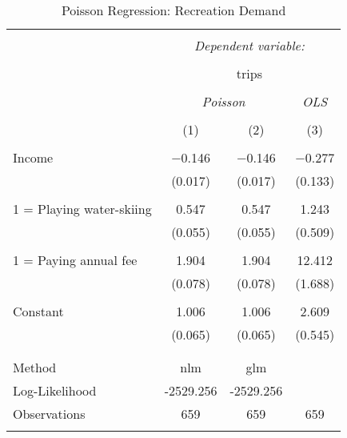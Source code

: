 \documentclass[
  12pt,
]{article}
\begin{document}
\begin{table}[t] \centering 
  \caption{Poisson Regression: Recreation Demand} 
  \label{recreation} 
\begin{tabular}{@{\extracolsep{5pt}}lccc} 
\\[-1.8ex]\hline 
\hline \\[-1.8ex] 
 & \multicolumn{3}{c}{\textit{Dependent variable:}} \\ 
\cline{2-4} 
\\[-1.8ex] & \multicolumn{3}{c}{trips} \\ 
\\[-1.8ex] & \multicolumn{2}{c}{\textit{Poisson}} & \textit{OLS} \\ 
\\[-1.8ex] & (1) & (2) & (3)\\ 
\hline \\[-1.8ex] 
 Income & $-$0.146 & $-$0.146 & $-$0.277 \\ 
  & (0.017) & (0.017) & (0.133) \\ 
  & & & \\ 
 1 = Playing water-skiing & 0.547 & 0.547 & 1.243 \\ 
  & (0.055) & (0.055) & (0.509) \\ 
  & & & \\ 
 1 = Paying annual fee & 1.904 & 1.904 & 12.412 \\ 
  & (0.078) & (0.078) & (1.688) \\ 
  & & & \\ 
 Constant & 1.006 & 1.006 & 2.609 \\ 
  & (0.065) & (0.065) & (0.545) \\ 
  & & & \\ 
\hline \\[-1.8ex] 
Method & nlm & glm &  \\ 
Log-Likelihood & -2529.256 & -2529.256 &  \\ 
Observations & 659 & 659 & 659 \\ 
\hline 
\hline \\[-1.8ex] 
\end{tabular} 
\end{table}
\end{document}
